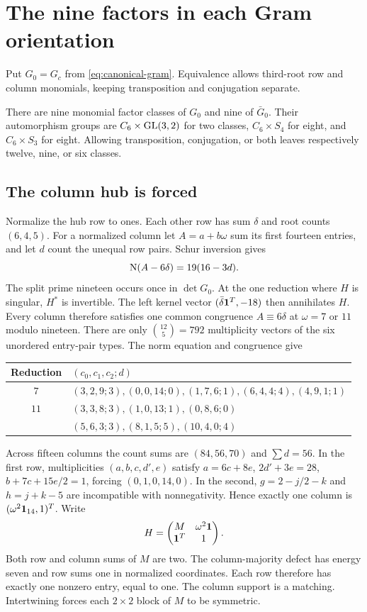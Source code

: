 \section{The nine factors in each Gram orientation}\label{app:factors-new}
Put $G_0=G_c$ from \eqref{eq:canonical-gram}. Equivalence allows third-root row and column monomials, keeping transposition and conjugation separate.
\begin{theorem}\label{thm:factors-new}
There are nine monomial factor classes of $G_0$ and nine of $\bar G_0$. Their automorphism groups are $C_6\times\operatorname{GL}(3,2)$ for two classes, $C_6\times S_4$ for eight, and $C_6\times S_3$ for eight. Allowing transposition, conjugation, or both leaves respectively twelve, nine, or six classes.
\end{theorem}
\subsection{The column hub is forced}
Normalize the hub row to ones. Each other row has sum $\delta$ and root counts $(6,4,5)$. For a normalized column let $A=a+b\omega$ sum its first fourteen entries, and let $d$ count the unequal row pairs. Schur inversion gives
\[\operatorname N(A-6\delta)=19(16-3d).\]
The split prime nineteen occurs once in $\det G_0$. At the one reduction where $H$ is singular, $H^*$ is invertible. The left kernel vector $(\bar\delta\mathbf1^T,-18)$ then annihilates $H$. Every column therefore satisfies one common congruence $A\equiv6\delta$ at $\omega=7$ or $11$ modulo nineteen.
There are only $\binom{12}{5}=792$ multiplicity vectors of the six unordered entry-pair types. The norm equation and congruence give
\begin{center}\begin{tabular}{cp{100mm}}\toprule
Reduction&$(c_0,c_1,c_2;d)$\\\midrule
$7$&$(3,2,9;3),(0,0,14;0),(1,7,6;1),(6,4,4;4),(4,9,1;1)$\\
$11$&$(3,3,8;3),(1,0,13;1),(0,8,6;0)$\\
&$(5,6,3;3),(8,1,5;5),(10,4,0;4)$\\\bottomrule\end{tabular}\end{center}
Across fifteen columns the count sums are $(84,56,70)$ and $\sum d=56$. In the first row, multiplicities $(a,b,c,d',e)$ satisfy $a=6c+8e$, $2d'+3e=28$, $b+7c+15e/2=1$, forcing $(0,1,0,14,0)$. In the second, $g=2-j/2-k$ and $h=j+k-5$ are incompatible with nonnegativity. Hence exactly one column is $(\omega^2\mathbf1_{14},1)^T$. Write
\[H=\begin{pmatrix}M&\omega^2\mathbf1\\\mathbf1^T&1\end{pmatrix}.\]
Both row and column sums of $M$ are two. The column-majority defect has energy seven and row sums one in normalized coordinates. Each row therefore has exactly one nonzero entry, equal to one. The column support is a matching. Intertwining forces each $2\times2$ block of $M$ to be symmetric.

